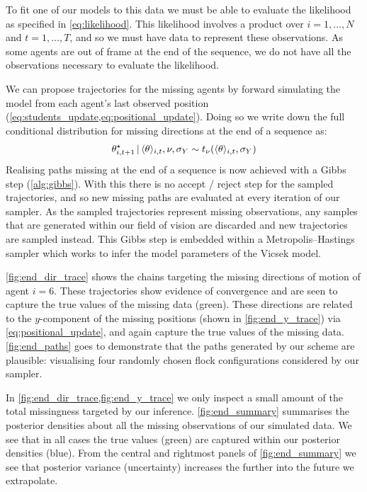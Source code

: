 To fit one of our models to this data we must be able to evaluate the
likelihood as specified in \cref{eq:likelihood}. This likelihood involves a
product over $i=1,\ldots,N$ and $t=1,\ldots,T$, and so we must have data to
represent these observations. As some agents are out of frame at the end of the
sequence, we do not have all the observations necessary to evaluate the
likelihood.

We can propose trajectories for the missing agents by forward simulating the
model from each agent's last observed position
(\cref{eq:students_update,eq:positional_update}). Doing so we write down the
full conditional distribution for missing directions at the end of a sequence
as:
\begin{equation}
  \theta_{i,t+1}^\star \,|\, \langle\theta\rangle_{i,t}, \nu, \sigma_Y \sim
  t_{\nu}(\langle\theta\rangle_{i,t}, \sigma_Y)
\end{equation}
Realising paths missing at the end of a sequence is now achieved with a Gibbs
step (\cref{alg:gibbs}). With this there is no accept / reject step for the
sampled trajectories, and so new missing paths are evaluated at every iteration
of our sampler. As the sampled trajectories represent missing observations, any
samples that are generated within our field of vision are discarded and new
trajectories are sampled instead. This Gibbs step is embedded within a
Metropolis--Hastings sampler which works to infer the model parameters of the
Vicsek model.

\cref{fig:end_dir_trace} shows the chains targeting the missing directions of
motion of agent $i=6$. These trajectories show evidence of convergence and are
seen to capture the true values of the missing data (green). These directions
are related to the $y$-component of the missing positions (shown in
\cref{fig:end_y_trace}) via \cref{eq:positional_update}, and again capture the
true values of the missing data. \cref{fig:end_paths} goes to demonstrate that
the paths generated by our scheme are plausible: visualising four randomly
chosen flock configurations considered by our sampler.

In \cref{fig:end_dir_trace,fig:end_y_trace} we only inspect a small amount of
the total missingness targeted by our inference. \cref{fig:end_summary}
summarises the posterior densities about all the missing observations of our
simulated data. We see that in all cases the true values (green) are captured
within our posterior densities (blue). From the central and rightmost panels of
\cref{fig:end_summary} we see that posterior variance (uncertainty) increases
the further into the future we extrapolate.

